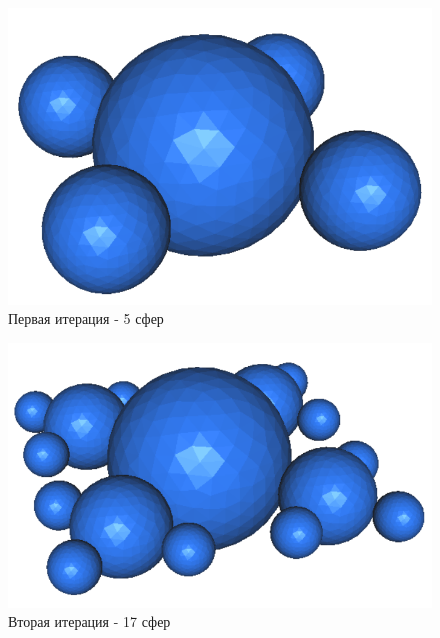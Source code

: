 \begin{figure}[h!]
	\centering
	\includegraphics[width=0.5\linewidth]{2nd_scatterer}
	\caption{Первая итерация - 5 сфер}
	\label{fig:2nd_scatterer}
\end{figure}
\begin{figure}[h!]
	\centering
	\includegraphics[width=0.5\linewidth]{3td_scatterer}
	\caption{Вторая итерация - 17 сфер}
	\label{fig:3td_scatterer}
\end{figure} 
